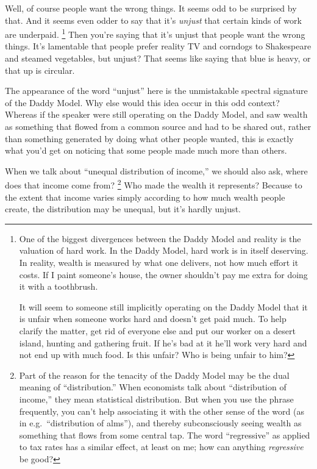 \documentclass[12pt]{book}
\begin{document}
Well, of course people want the wrong things. It seems odd to be
surprised by that. And it seems even odder to say that it's
\emph{unjust} that certain kinds of work are underpaid.
\footnote{One of the biggest divergences between the Daddy Model and
reality is the valuation of hard work. In the Daddy Model, hard work is
in itself deserving. In reality, wealth is measured by what one
delivers, not how much effort it costs. If I paint someone's house, the
owner shouldn't pay me extra for doing it with a toothbrush.

It will seem to someone still implicitly operating on the Daddy Model
that it is unfair when someone works hard and doesn't get paid much. To
help clarify the matter, get rid of everyone else and put our worker on
a desert island, hunting and gathering fruit. If he's bad at it he'll
work very hard and not end up with much food. Is this unfair? Who is
being unfair to him?} Then you're saying that it's unjust that people
want the wrong things. It's lamentable that people prefer reality TV and
corndogs to Shakespeare and steamed vegetables, but unjust? That seems
like saying that blue is heavy, or that up is circular.

The appearance of the word ``unjust'' here is the unmistakable spectral
signature of the Daddy Model. Why else would this idea occur in this odd
context? Whereas if the speaker were still operating on the Daddy Model,
and saw wealth as something that flowed from a common source and had to
be shared out, rather than something generated by doing what other
people wanted, this is exactly what you'd get on noticing that some
people made much more than others.

When we talk about ``unequal distribution of income,'' we should also
ask, where does that income come from? \footnote{Part of the reason for the tenacity of the Daddy Model may be
the dual meaning of ``distribution.'' When economists talk about
``distribution of income,'' they mean statistical distribution. But when
you use the phrase frequently, you can't help associating it with the
other sense of the word (as in e.g.~``distribution of alms''), and
thereby subconsciously seeing wealth as something that flows from some
central tap. The word ``regressive'' as applied to tax rates has a
similar effect, at least on me; how can anything \emph{regressive} be
good?} Who made
the wealth it represents? Because to the extent that income varies
simply according to how much wealth people create, the distribution may
be unequal, but it's hardly unjust.
\end{document}
